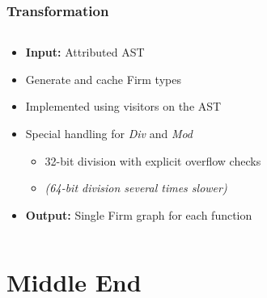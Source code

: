 \documentclass[navbaroff,en]{sdqbeamer}
\begin{document}
\begin{frame}
	\frametitle{Transformation}

	\begin{columns}
		\begin{column}{0.45\textwidth}
			\begin{itemize}
				\item \textbf{Input:} Attributed AST
				\item Generate and cache Firm types
				\item Implemented using visitors on the AST

				\vspace{1em}

				\item Special handling for \textit{Div} and \textit{Mod}
				\begin{itemize}
					\item 32-bit division with explicit overflow checks
					\item \textit{(64-bit division several times slower)}
				\end{itemize}

				\vspace{1em}

				\item \textbf{Output:} Single Firm graph for each function
			\end{itemize}
		\end{column}
		\begin{column}{0.58\textwidth}
			\centering
			\scalebox{0.2}{}
		\end{column}
	\end{columns}

\end{frame}


\section{Middle End}
\end{document}
